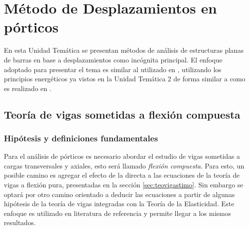 \chapter[Método de Desplazamientos en pórticos]{Método de Desplazamientos en pórticos}

En esta Unidad Temática se presentan métodos de análisis de estructuras planas de barras en base a desplazamientos como incógnita principal. %
%
El enfoque adoptado para presentar el tema es similar al utilizado en \citep{Pilkey2002,Wunderlich2002}, utilizando los principios energéticos ya vistos en la Unidad Temática 2 de forma similar a como es realizado en \citep{Reddy2002b}.




\section{Teoría de vigas sometidas a flexión compuesta} \label{sec:teoviga}

\subsection{Hipótesis y definiciones fundamentales}

Para el análisis de pórticos es necesario abordar el estudio de vigas sometidas a cargas transversales y axiales, esto será llamado \textit{flexión compuesta}. %
%
Para esto, un posible camino es agregar el efecto de la directa a las ecuaciones de la teoría de vigas a flexión pura, presentadas en la sección \ref{sec:teovigastimo}. %
%
Sin embargo se optará por otro camino orientado a deducir las ecuaciones a partir de algunas hipótesis de la teoría de vigas integradas con la Teoría de la Elasticidad. %
%
Este enfoque es utilizado en literatura de referencia \citep{Wunderlich2002,Onate2013} y permite llegar a los mismos resultados.

